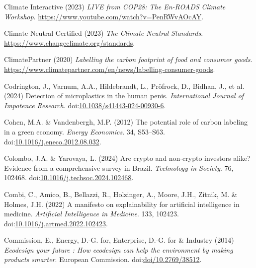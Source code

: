 \documentclass[
  letterpaper,
  DIV=11,
  numbers=noendperiod]{scrartcl}
\newlength{\cslhangindent}
\newenvironment{CSLReferences}[2] %
 {\begin{list}{}{%
  \setlength{\itemindent}{0pt}
  \setlength{\leftmargin}{0pt}
  \setlength{\parsep}{0pt}
  \ifodd #1
   \setlength{\leftmargin}{\cslhangindent}
   \setlength{\itemindent}{-1\cslhangindent}
  \fi
  \setlength{\itemsep}{#2\baselineskip}}}
 {\end{list}}
\begin{document}
\begin{CSLReferences}{0}{1}
Climate Interactive (2023) \emph{{LIVE} from {COP28}: {The En-ROADS
Climate Workshop}}. \url{https://www.youtube.com/watch?v=PenRWvAOcAY}.

Climate Neutral Certified (2023) \emph{The {Climate Neutral Standards}}.
\url{https://www.changeclimate.org/standards}.

ClimatePartner (2020) \emph{Labelling the carbon footprint of food and
consumer goods}.
\url{https://www.climatepartner.com/en/news/labelling-consumer-goods}.

Codrington, J., Varnum, A.A., Hildebrandt, L., Pröfrock, D., Bidhan, J.,
et al. (2024) Detection of microplastics in the human penis.
\emph{International Journal of Impotence Research}.
doi:\href{https://doi.org/10.1038/s41443-024-00930-6}{10.1038/s41443-024-00930-6}.

Cohen, M.A. \& Vandenbergh, M.P. (2012) The potential role of carbon
labeling in a green economy. \emph{Energy Economics}. 34, S53--S63.
doi:\href{https://doi.org/10.1016/j.eneco.2012.08.032}{10.1016/j.eneco.2012.08.032}.

Colombo, J.A. \& Yarovaya, L. (2024) Are crypto and non-crypto investors
alike? {Evidence} from a comprehensive survey in {Brazil}.
\emph{Technology in Society}. 76, 102468.
doi:\href{https://doi.org/10.1016/j.techsoc.2024.102468}{10.1016/j.techsoc.2024.102468}.

Combi, C., Amico, B., Bellazzi, R., Holzinger, A., Moore, J.H., Zitnik,
M. \& Holmes, J.H. (2022) A manifesto on explainability for artificial
intelligence in medicine. \emph{Artificial Intelligence in Medicine}.
133, 102423.
doi:\href{https://doi.org/10.1016/j.artmed.2022.102423}{10.1016/j.artmed.2022.102423}.

Commission, E., Energy, D.-G. for, Enterprise, D.-G. for \& Industry
(2014) \emph{Ecodesign your future : How ecodesign can help the
environment by making products smarter}. European Commission.
doi:\href{https://doi.org/doi/10.2769/38512}{doi/10.2769/38512}.


\end{CSLReferences}
\end{document}
